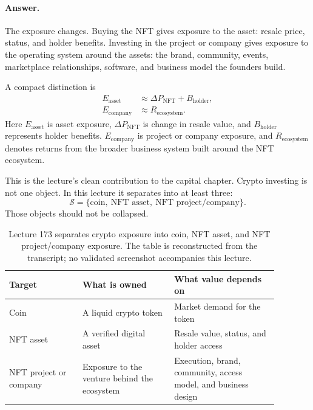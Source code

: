 \documentclass[11pt,oneside]{book}
\begin{document}
\paragraph{Answer.}
The exposure changes. Buying the NFT gives exposure to the asset: resale price, status, and holder benefits. Investing in the project or company gives exposure to the operating system around the assets: the brand, community, events, marketplace relationships, software, and business model the founders build.

A compact distinction is
\begin{align}
E_{\mathrm{asset}}
&\approx
\Delta P_{\mathrm{NFT}}+B_{\mathrm{holder}},\\
E_{\mathrm{company}}
&\approx
R_{\mathrm{ecosystem}}.
\end{align}
Here \(E_{\mathrm{asset}}\) is asset exposure, \(\Delta P_{\mathrm{NFT}}\) is change in resale value, and \(B_{\mathrm{holder}}\) represents holder benefits. \(E_{\mathrm{company}}\) is project or company exposure, and \(R_{\mathrm{ecosystem}}\) denotes returns from the broader business system built around the NFT ecosystem.

This is the lecture's clean contribution to the capital chapter. Crypto investing is not one object. In this lecture it separates into at least three:
\[
\mathcal{S}
=
\{\text{coin},\ \text{NFT asset},\ \text{NFT project/company}\}.
\]
Those objects should not be collapsed.

\begin{table}
\centering
\small
\begin{tabular}{p{0.24\linewidth}p{0.30\linewidth}p{0.34\linewidth}}
\hline
Target & What is owned & What value depends on \\
\hline
Coin & A liquid crypto token & Market demand for the token \\
NFT asset & A verified digital asset & Resale value, status, and holder access \\
NFT project or company & Exposure to the venture behind the ecosystem & Execution, brand, community, access model, and business design \\
\hline
\end{tabular}
\caption{Lecture 173 separates crypto exposure into coin, NFT asset, and NFT project/company exposure. The table is reconstructed from the transcript; no validated screenshot accompanies this lecture.}
\end{table}
\end{document}
